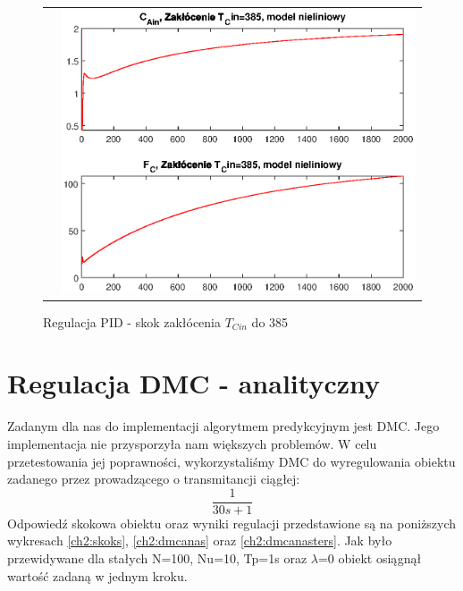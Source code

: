\begin{figure}
\begin{tabular}{cc}
	&
	\includegraphics[width=.5\linewidth]{img/pidnlin/pidnlin15.eps}
\end{tabular}
\label{ch2:pid8}
\caption{Regulacja PID - skok zakłócenia $T_{Cin}$ do 385}
\end{figure}

\section{Regulacja DMC - analityczny}
Zadanym dla nas do implementacji algorytmem predykcyjnym jest DMC. Jego implementacja nie przysporzyła nam większych problemów. W celu przetestowania jej poprawności, wykorzystaliśmy DMC do wyregulowania obiektu zadanego przez prowadzącego o transmitancji ciągłej:
\begin{equation}
	\frac{1}{30s+1}
\end{equation}
Odpowiedź skokowa obiektu oraz wyniki regulacji przedstawione są na poniższych wykresach \ref{ch2:skoks}, \ref{ch2:dmcanas} oraz \ref{ch2:dmcanasters}. Jak było przewidywane dla stałych N=100, Nu=10, Tp=1s oraz $\lambda$=0 obiekt osiągnął wartość zadaną w jednym kroku.

